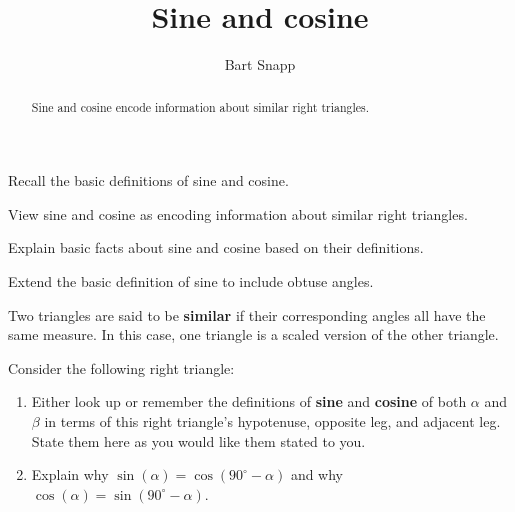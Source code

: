 \documentclass[noauthor,nooutcomes,hints,,12pt]{ximera}
\title{Sine and cosine}
\author{Bart Snapp}
\begin{document}
\begin{abstract}
  Sine and cosine encode information about similar right triangles.
\end{abstract}
\maketitle

\begin{listOutcomes}
\item Recall the basic definitions of sine and cosine.
\item View sine and cosine as encoding information about similar right
  triangles.
\item Explain basic facts about sine and cosine based on their
  definitions.
\item Extend the basic definition of sine to include obtuse angles. 
\end{listOutcomes}



\begin{definition}
 Two triangles are said to be \textbf{similar} if their corresponding angles all have the same measure.  In this case, one triangle is a scaled version of the other triangle.
\end{definition}


\mynewpage


\begin{question}
  Consider the following right triangle:
  \begin{center}
    \end{center}
  \begin{enumerate}
  \item Either look up or remember the definitions of \textbf{sine}
    and \textbf{cosine} of both $\alpha$ and $\beta$ in terms of this
    right triangle's hypotenuse, opposite leg, and adjacent leg. State them here as you would like them stated to you.  
    \item Explain why $\sin(\alpha) =
    \cos(90^\circ-\alpha)$ and why $\cos(\alpha) =
    \sin(90^\circ-\alpha)$.
\end{enumerate}
\end{question}
\mynewpage
\end{document}

